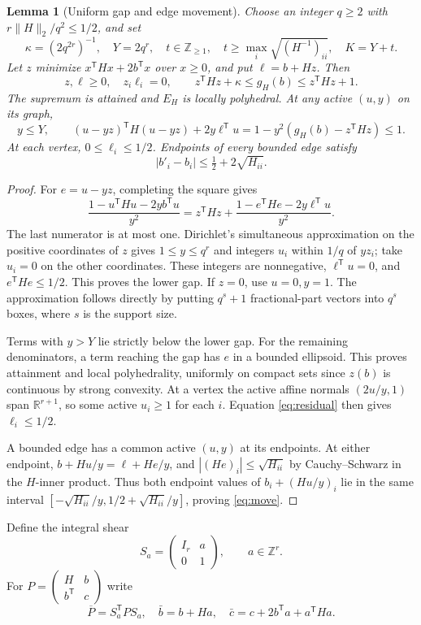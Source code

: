 \documentclass[11pt]{article}
\newtheorem{lemma}[theorem]{Lemma}
\theoremstyle{definition}\newtheorem{definition}[theorem]{Definition}
\theoremstyle{remark}\newtheorem{remark}[theorem]{Remark}
\newcommand{\R}{\mathbb R}\newcommand{\Q}{\mathbb Q}\newcommand{\Z}{\mathbb Z}
\newcommand{\T}{^{\mathsf T}}\newcommand{\norm}[1]{\lVert #1\rVert}
\begin{document}
\begin{lemma}[Uniform gap and edge movement]\label{lem:gap}
Choose an integer $q\ge2$ with $r\norm H_2/q^2\le1/2$, and set
\[
 \kappa=(2q^{2r})^{-1},\quad Y=2q^r,\quad
 t\in\Z_{\ge1},\quad t\ge\max_i\sqrt{(H^{-1})_{ii}},\quad K=Y+t.
\]
Let $z$ minimize $x\T Hx+2b\T x$ over $x\ge0$, and put $\ell=b+Hz$. Then
\[
 z,\ell\ge0,\quad z_i\ell_i=0,\qquad
 z\T Hz+\kappa\le g_H(b)\le z\T Hz+1.
\]
The supremum is attained and $E_H$ is locally polyhedral. At any active $(u,y)$ on its graph,
\begin{equation}\label{eq:residual}
 y\le Y,\qquad (u-yz)\T H(u-yz)+2y\ell\T u
 =1-y^2(g_H(b)-z\T Hz)\le1.
\end{equation}
At each vertex, $0\le\ell_i\le1/2$. Endpoints of every bounded edge satisfy
\begin{equation}\label{eq:move}
 |b'_i-b_i|\le\tfrac12+2\sqrt{H_{ii}}.
\end{equation}
\end{lemma}
\begin{proof}
For $e=u-yz$, completing the square gives
\[
 \frac{1-u\T Hu-2yb\T u}{y^2}
 =z\T Hz+\frac{1-e\T He-2y\ell\T u}{y^2}.
\]
The last numerator is at most one. Dirichlet's simultaneous approximation on the positive coordinates of $z$ gives $1\le y\le q^r$ and integers $u_i$ within $1/q$ of $yz_i$; take $u_i=0$ on the other coordinates. These integers are nonnegative, $\ell\T u=0$, and $e\T He\le1/2$. This proves the lower gap. If $z=0$, use $u=0,y=1$. The approximation follows directly by putting $q^s+1$ fractional-part vectors into $q^s$ boxes, where $s$ is the support size.

Terms with $y>Y$ lie strictly below the lower gap. For the remaining denominators, a term reaching the gap has $e$ in a bounded ellipsoid. This proves attainment and local polyhedrality, uniformly on compact sets since $z(b)$ is continuous by strong convexity. At a vertex the active affine normals $(2u/y,1)$ span $\R^{r+1}$, so some active $u_i\ge1$ for each $i$. Equation \eqref{eq:residual} then gives $\ell_i\le1/2$.

A bounded edge has a common active $(u,y)$ at its endpoints. At either endpoint,
$b+Hu/y=\ell+He/y$, and $|(He)_i|\le\sqrt{H_{ii}}$ by Cauchy--Schwarz in the $H$-inner product. Thus both endpoint values of $b_i+(Hu/y)_i$ lie in the same interval $[-\sqrt{H_{ii}}/y,1/2+\sqrt{H_{ii}}/y]$, proving \eqref{eq:move}.
\end{proof}

Define the integral shear
\[
 S_a=\begin{pmatrix}I_r&a\\0&1\end{pmatrix},\qquad a\in\Z^r.
\]
For $P=\left(\begin{smallmatrix}H&b\\b\T&c\end{smallmatrix}\right)$ write
\[
 \overline P=S_a\T PS_a,
 \quad\bar b=b+Ha,\quad\bar c=c+2b\T a+a\T Ha.
\]
\end{document}
